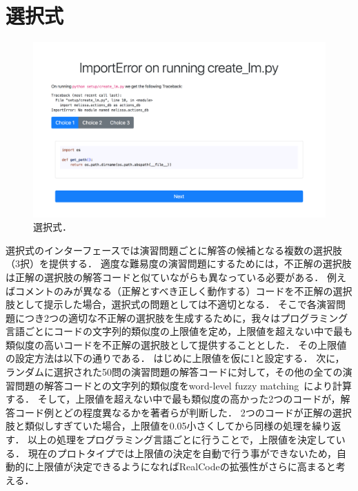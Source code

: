 \section{選択式}
\begin{figure}[t]
	\centering
  \includegraphics[width=1.0\columnwidth]{20181228-interface-mcq.png}
  \caption{選択式．}
  \label{fig:mcq}
\end{figure}

選択式のインターフェースでは演習問題ごとに解答の候補となる複数の選択肢（3択）を提供する．
適度な難易度の演習問題にするためには，不正解の選択肢は正解の選択肢の解答コードと似ていながらも異なっている必要がある．
例えばコメントのみが異なる（正解とすべき正しく動作する）コードを不正解の選択肢として提示した場合，選択式の問題としては不適切となる．
そこで各演習問題につき2つの適切な不正解の選択肢を生成するために，我々はプログラミング言語ごとにコードの文字列的類似度の上限値を定め，上限値を超えない中で最も類似度の高いコードを不正解の選択肢として提供することとした．
その上限値の設定方法は以下の通りである．
はじめに上限値を仮に1と設定する．
次に，ランダムに選択された50問の演習問題の解答コードに対して，その他の全ての演習問題の解答コードとの文字列的類似度をword-level fuzzy matching~\cite{sankoff1983time}により計算する．
そして，上限値を超えない中で最も類似度の高かった2つのコードが，解答コード例とどの程度異なるかを著者らが判断した．
2つのコードが正解の選択肢と類似しすぎていた場合，上限値を0.05小さくしてから同様の処理を繰り返す．
以上の処理をプログラミング言語ごとに行うことで，上限値を決定している．
現在のプロトタイプでは上限値の決定を自動で行う事ができないため，自動的に上限値が決定できるようになればRealCodeの拡張性がさらに高まると考える．

